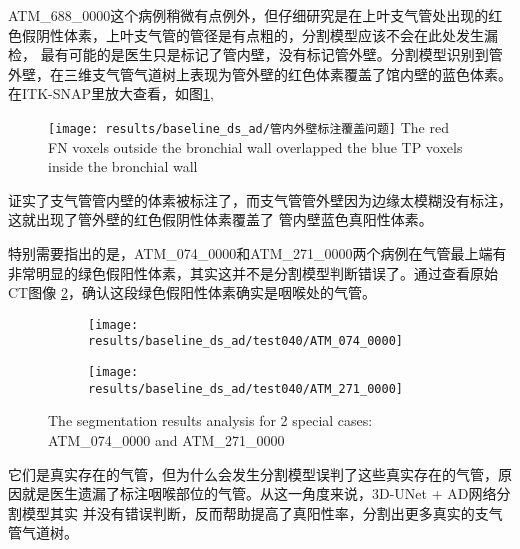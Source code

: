 ATM\_688\_0000这个病例稍微有点例外，但仔细研究是在上叶支气管处出现的红色假阴性体素，上叶支气管的管径是有点粗的，分割模型应该不会在此处发生漏检，
最有可能的是医生只是标记了管内壁，没有标记管外壁。分割模型识别到管外壁，在三维支气管气道树上表现为管外壁的红色体素覆盖了馆内壁的蓝色体素。
在ITK-SNAP里放大查看，如图\ref{fig:annotation_overlap},
\begin{figure}[h]
    \centering
    \texttt{[image: results/baseline\_ds\_ad/管内外壁标注覆盖问题]}
    	{The red FN voxels outside the bronchial wall overlapped the blue TP voxels inside the bronchial wall}
    \label{fig:annotation_overlap}
\end{figure}
证实了支气管管内壁的体素被标注了，而支气管管外壁因为边缘太模糊没有标注，这就出现了管外壁的红色假阴性体素覆盖了
管内壁蓝色真阳性体素。

特别需要指出的是，ATM\_074\_0000和ATM\_271\_0000两个病例在气管最上端有非常明显的绿色假阳性体素，其实这并不是分割模型判断错误了。通过查看原始CT图像
\ref{fig:two_special_cases}，确认这段绿色假阳性体素确实是咽喉处的气管。
\begin{figure}[!htp]
	\centering
	\begin{subfigure}{0.48\textwidth}
		\texttt{[image: results/baseline\_ds\_ad/test040/ATM\_074\_0000]}
	\end{subfigure}
	\hfill
	\begin{subfigure}{0.48\textwidth}
		\texttt{[image: results/baseline\_ds\_ad/test040/ATM\_271\_0000]}
	\end{subfigure}
        {The segmentation results analysis for 2 special cases: ATM\_074\_0000 and ATM\_271\_0000}
	\label{fig:two_special_cases}
\end{figure}
它们是真实存在的气管，但为什么会发生分割模型误判了这些真实存在的气管，原因就是医生遗漏了标注咽喉部位的气管。从这一角度来说，3D-UNet + AD网络分割模型其实
并没有错误判断，反而帮助提高了真阳性率，分割出更多真实的支气管气道树。

